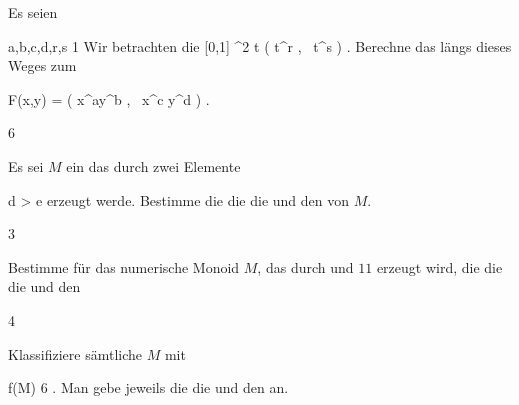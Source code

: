 {}
{





Es seien

\mavergleichskette
{\vergleichskette
{ a,b,c,d,r,s
}
{ \geq }{ 1
}
{  }{
}
{    }{
}
{   }{
}
}
{}{}{}
Wir betrachten die
\maabbeledisp {} { [0,1] } { \R^2
} { t } {   \left(  t^r   , \,   t^s                   \right)
} {.}
Berechne das
längs dieses Weges zum

\mavergleichskettedisp
{\vergleichskette
{ F(x,y)
}
{ =} {  \left(  x^ay^b   , \,   x^c y^d                   \right)
}
{ } {
}
{ } {
}
{ } {
}
}
{}{}{.}





}
{} {}






{6}
{





Es sei $M$ ein
das durch zwei
Elemente

\mavergleichskette
{\vergleichskette
{ d
}
{ > }{ e
}
{  }{
}
{    }{
}
{   }{
}
}
{}{}{}
erzeugt werde. Bestimme die
die
die
und den
von $M$.





}
{} {}

{3}
{





Bestimme für das numerische Monoid $M$, das durch
 und $11$ erzeugt wird, die
 die
 die
 und den





}
{} {}

{4}
{





Klassifiziere sämtliche
$M$
 {} {} mit

\mavergleichskette
{\vergleichskette
{ f(M)
}
{ \leq }{ 6
}
{  }{
}
{    }{
}
{   }{
}
}
{}{}{.}
Man gebe jeweils die
die
und den
an.





}
{} {}

